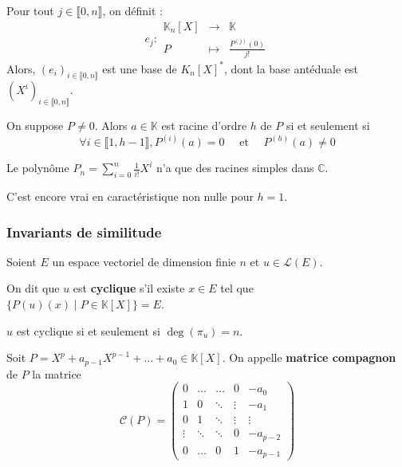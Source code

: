   \begin{application}
    Pour tout $j \in \llbracket 0, n \rrbracket$, on définit :
    \[
    e_j : \begin{array}{ccc}
      \mathbb{K}_n[X] &\rightarrow& \mathbb{K} \\
      P &\mapsto& \frac{P^{(j)}(0)}{j!}
    \end{array}
    \]
    Alors, $(e_i)_{i \in \llbracket 0, n \rrbracket}$ est une base de $K_n[X]^*$, dont la base antéduale est $(X^i)_{i \in \llbracket 0, n \rrbracket}$.
  \end{application}


  \begin{corollary}
    On suppose $P \neq 0$. Alors $a \in \mathbb{K}$ est racine d'ordre $h$ de $P$ si et seulement si
    \[ \forall i \in \llbracket 1, h-1 \rrbracket, P^{(i)}(a) = 0 \quad \text{ et } \quad P^{(h)}(a) \neq 0 \]
  \end{corollary}

  \begin{example}
    Le polynôme $P_n = \sum_{i=0}^{n} \frac{1}{i!} X^{i}$ n'a que des racines simples dans $\mathbb{C}$.
  \end{example}

  \begin{remark}
    C'est encore vrai en caractéristique non nulle pour $h = 1$.
  \end{remark}

  \subsubsection{Invariants de similitude}


  Soient $E$ un espace vectoriel de dimension finie $n$ et $u \in \mathcal{L}(E)$.

  \begin{definition}
    On dit que $u$ est \textbf{cyclique} s'il existe $x \in E$ tel que $\{ P(u)(x) \mid P \in \mathbb{K}[X] \} = E$.
  \end{definition}

  \begin{proposition}
    $u$ est cyclique si et seulement si $\deg(\pi_u) = n$.
  \end{proposition}

  \begin{definition}
    Soit $P = X^p + a_{p-1} X^{p-1} + \dots + a_0 \in \mathbb{K}[X]$. On appelle \textbf{matrice compagnon} de $P$ la matrice
    \[ \mathcal{C}(P) = \begin{pmatrix} 0 & \dots & \dots & 0 & -a_0 \\ 1 & 0 & \ddots & \vdots & -a_1 \\ 0 & 1 & \ddots & \vdots & \vdots \\ \vdots & \ddots & \ddots & 0 & -a_{p-2} \\ 0 & \dots & 0 & 1 & -a_{p-1} \end{pmatrix} \]
  \end{definition}

